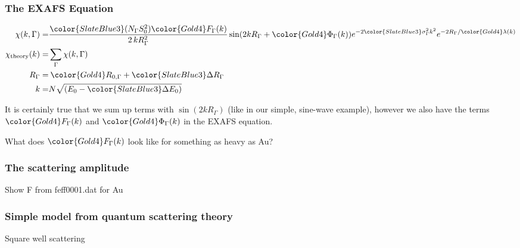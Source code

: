 \documentclass[10pt, xcolor=x11names, compress]{beamer}
\begin{document}
\begin{frame}
  \frametitle{The EXAFS Equation}
  {\small
    \begin{align}
      \chi(k,\Gamma) =&
      { \frac{{\color{SlateBlue3}(N_\Gamma S_0^2)}{\color{Gold4}F_\Gamma(k)}}
        {2\,kR_\Gamma^2} }
      \sin(2kR_\Gamma + {\color{Gold4}\Phi_\Gamma(k)})
      e^{-2{\color{SlateBlue3}\sigma_\Gamma^2}k^2}
      e^{-2R_\Gamma/{\color{Gold4}\lambda(k)}} \\
      \chi_{\mathrm{theory}}(k) =& \sum\limits_{\Gamma}\chi(k,\Gamma) \notag\\
      R_\Gamma =& \> {\color{Gold4}R_{0,\Gamma}} +
      {\color{SlateBlue3}\Delta R_\Gamma} \\
      k =& N\sqrt{(E_0 - {\color{SlateBlue3}\Delta E_0})}
    \end{align}}

  \medskip

  It is certainly true that we sum up terms with $\sin(2kR_\Gamma)$
  (like in our simple, sine-wave example), however we also have the
  terms ${\color{Gold4}F_\Gamma(k)}$ and
  ${\color{Gold4}\Phi_\Gamma(k)}$ in the EXAFS equation.

  \medskip

  \begin{block}{}
    \centering What does ${\color{Gold4}F_\Gamma(k)}$ look like for
    something as heavy as Au?
  \end{block}
\end{frame}

\begin{frame}
  \frametitle{The scattering amplitude}
  Show F from feff0001.dat for Au
\end{frame}

\begin{frame}
  \frametitle{Simple model from quantum scattering theory}
  Square well scattering
\end{frame}
\end{document}
